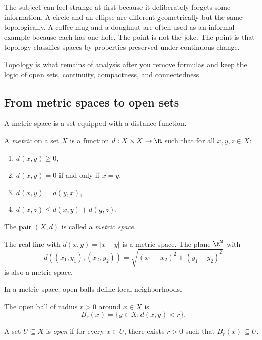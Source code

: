 The subject can feel strange at first because it deliberately forgets some
information. A circle and an ellipse are different geometrically but the same
topologically. A coffee mug and a doughnut are often used as an informal example
because each has one hole. The point is not the joke. The point is that topology
classifies spaces by properties preserved under continuous change.

\begin{focusbox}
Topology is what remains of analysis after you remove formulas and keep the
logic of open sets, continuity, compactness, and connectedness.
\end{focusbox}

\subsection{From metric spaces to open sets}

A metric space is a set equipped with a distance function.

\begin{definition}
A \emph{metric} on a set $X$ is a function $d:X\times X\to\R$ such that for all
$x,y,z\in X$:
\begin{enumerate}
\item $d(x,y)\geq 0$,
\item $d(x,y)=0$ if and only if $x=y$,
\item $d(x,y)=d(y,x)$,
\item $d(x,z)\leq d(x,y)+d(y,z)$.
\end{enumerate}
The pair $(X,d)$ is called a \emph{metric space}.
\end{definition}

\begin{example}
The real line with $d(x,y)=|x-y|$ is a metric space. The plane $\R^2$ with
\[
d((x_1,y_1),(x_2,y_2))=\sqrt{(x_1-x_2)^2+(y_1-y_2)^2}
\]
is also a metric space.
\end{example}

In a metric space, open balls define local neighborhoods.

\begin{definition}
The open ball of radius $r>0$ around $x\in X$ is
\[
B_r(x)=\{y\in X:d(x,y)<r\}.
\]
\end{definition}

\begin{definition}
A set $U\subseteq X$ is \emph{open} if for every $x\in U$, there exists
$r>0$ such that $B_r(x)\subseteq U$.
\end{definition}


